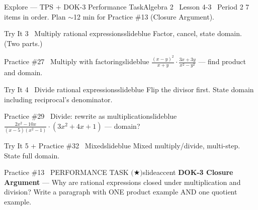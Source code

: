 \documentclass[aspectratio=169, 11pt]{beamer}
\begin{document}
\begin{frame}{Explore --- TPS + DOK-3 Performance Task}{Algebra 2 \textperiodcentered\ Lesson 4-3 \textperiodcentered\ Period 2}
\small\textcolor{slidegray}{7 items in order. Plan \(\sim\)12 min for Practice \#13 (Closure Argument).}

\vspace{0.10cm}
\begin{projcard}{Try It 3 \textperiodcentered\ Multiply rational expressions}{slideblue}
Factor, cancel, state domain. (Two parts.)
\end{projcard}
\vspace{-0.12cm}
\begin{projcard}{Practice \#27 \textperiodcentered\ Multiply with factoring}{slideblue}
\(\displaystyle\frac{(x-y)^2}{x+y}\cdot\frac{3x+3y}{x^2-y^2}\) --- find product and domain.
\end{projcard}
\vspace{-0.12cm}
\begin{projcard}{Try It 4 \textperiodcentered\ Divide rational expressions}{slideblue}
Flip the divisor first. State domain including reciprocal's denominator.
\end{projcard}
\vspace{-0.12cm}
\begin{projcard}{Practice \#29 \textperiodcentered\ Divide: rewrite as multiplication}{slideblue}
\(\displaystyle\frac{2x^2-10x}{(x-5)(x^2-1)}\cdot(3x^2+4x+1)\) --- domain?
\end{projcard}
\vspace{-0.12cm}
\begin{projcard}{Try It 5 + Practice \#32 \textperiodcentered\ Mixed}{slideblue}
Mixed multiply/divide, multi-step. State full domain.
\end{projcard}
\vspace{-0.12cm}
\begin{projcard}{Practice \#13 \textperiodcentered\ PERFORMANCE TASK \(\bigl(\bigstar\bigr)\)}{slideaccent}
\textbf{DOK-3 Closure Argument} --- Why are rational expressions closed under multiplication and division? Write a paragraph with ONE product example AND one quotient example.
\end{projcard}
\end{frame}
\end{document}
